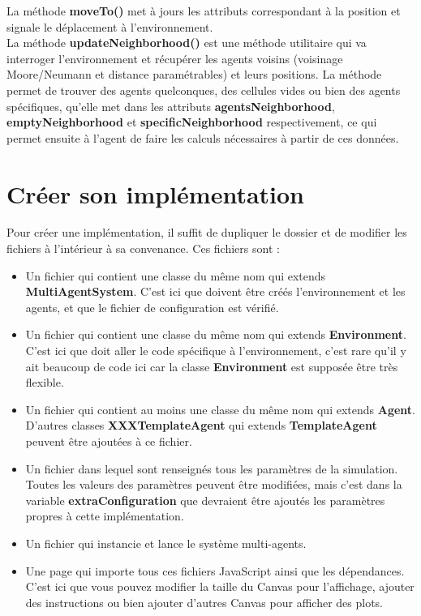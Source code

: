 \documentclass[11pt,a4paper,oneside]{report}
\begin{document}
La méthode \textbf{moveTo()} met à jours les attributs correspondant à la position et signale le déplacement à l'environnement.\\
La méthode \textbf{updateNeighborhood()} est une méthode utilitaire qui va interroger l'environnement et récupérer les agents voisins (voisinage Moore/Neumann et distance paramétrables) et leurs positions. La méthode permet de trouver des agents quelconques, des cellules vides ou bien des agents spécifiques, qu'elle met dans les attributs \textbf{agentsNeighborhood}, \textbf{emptyNeighborhood} et \textbf{specificNeighborhood} respectivement, ce qui permet ensuite à l'agent de faire les calculs nécessaires à partir de ces données.

\newpage

\section*{Créer son implémentation}

Pour créer une implémentation, il suffit de dupliquer le dossier  et de modifier les fichiers à l'intérieur à sa convenance. Ces fichiers sont :
\begin{itemize}
\item Un fichier  qui contient une classe du même nom qui extends \textbf{MultiAgentSystem}. C'est ici que doivent être créés l'environnement et les agents, et que le fichier de configuration est vérifié.
\item Un fichier  qui contient une classe du même nom qui extends \textbf{Environment}. C'est ici que doit aller le code spécifique à l'environnement, c'est rare qu'il y ait beaucoup de code ici car la classe \textbf{Environment} est supposée être très flexible.
\item Un fichier  qui contient au moins une classe du même nom qui extends \textbf{Agent}. D'autres classes \textbf{XXXTemplateAgent} qui extends \textbf{TemplateAgent} peuvent être ajoutées à ce fichier.
\item Un fichier  dans lequel sont renseignés tous les paramètres de la simulation. Toutes les valeurs des paramètres peuvent être modifiées, mais c'est dans la variable \textbf{extraConfiguration} que devraient être ajoutés les paramètres propres à cette implémentation.
\item Un fichier  qui instancie et lance le système multi-agents.
\item Une page  qui importe tous ces fichiers JavaScript ainsi que les dépendances. C'est ici que vous pouvez modifier la taille du Canvas pour l'affichage, ajouter des instructions ou bien ajouter d'autres Canvas pour afficher des plots.
\end{itemize}
\end{document}
